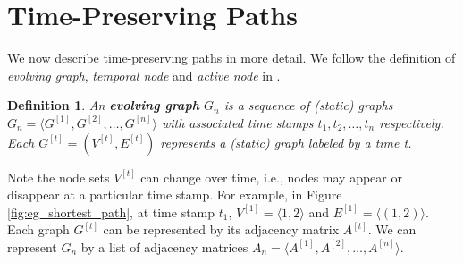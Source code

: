 \documentclass[12pt]{article}
\newtheorem{definition}{Definition}
\theoremstyle{definition}
\begin{document}






\section{Time-Preserving Paths}
\label{sec:time-pres-paths}

We now describe time-preserving paths in more detail. We follow the definition of
\emph{evolving graph}, \emph{temporal node} and \emph{active node} in \cite{chen16}.

\begin{definition}
  An \textbf{evolving graph} $G_n$ is a sequence of (static) graphs
$G_n = \langle G^{[1]}, G^{[2]},  \ldots ,G^{[n]} \rangle$ with associated time stamps
$t_1, t_2, \ldots, t_n$ respectively. Each $G^{[t]} = (V^{[t]}, E^{[t]})$ represents a (static) graph labeled by a time t.
\end{definition}

Note the node sets $V^{[t]}$ can change over time, i.e., nodes may appear or disappear at a particular time stamp.
For example, in Figure \ref{fig:eg_shortest_path}, at time stamp $t_1$, $V^{[1]} = \langle 1, 2 \rangle$ and $E^{[1]} = \langle (1,2) \rangle$. Each graph $G^{[t]}$ can be represented by its adjacency matrix $A^{[t]}$.
We can represent $G_n$ by a list of adjacency matrices $A_n = \langle A^{[1]}, A^{[2]}, \ldots, A^{[n]} \rangle$.
\end{document}
